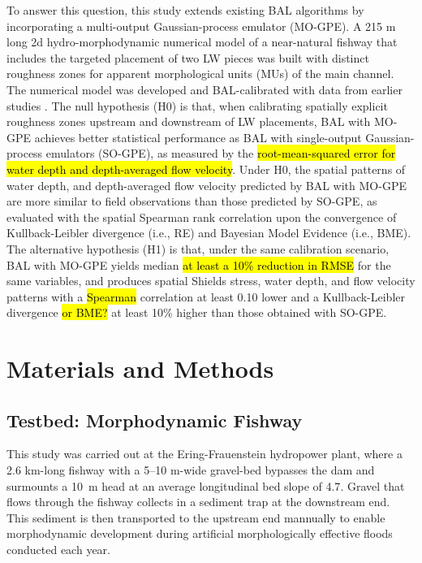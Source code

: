\documentclass[draft,linenumbers,onecolumn]{agujournal2019} %
\begin{document}
To answer this question, this study extends existing BAL algorithms by incorporating a multi-output Gaussian-process emulator (MO-GPE). A 215 m long 2d hydro-morphodynamic numerical model of a near-natural fishway that includes the targeted placement of two LW pieces was built with distinct roughness zones for apparent morphological units (MUs) of the main channel. The numerical model was developed and BAL-calibrated with data from earlier studies \cite{schwindt2023fuzzylogic, schalko2024flow, scolari2025hydromorphodynamic}. The null hypothesis (H0) is that, when calibrating spatially explicit roughness zones upstream and downstream of LW placements, BAL with MO-GPE achieves better statistical performance as BAL with single-output Gaussian-process emulators (SO-GPE), as measured by the \hl{root-mean-squared error for water depth and depth-averaged flow velocity}. Under H0, the spatial patterns of water depth, and depth-averaged flow velocity predicted by BAL with MO-GPE are more similar to field observations than those predicted by SO-GPE, as evaluated with the spatial Spearman rank correlation upon the convergence of Kullback-Leibler divergence (i.e., RE) and  Bayesian Model Evidence (i.e., BME). The alternative hypothesis (H1) is that, under the same calibration scenario, BAL with MO-GPE yields median \hl{at least a 10\% reduction in RMSE} for the same variables, and produces spatial Shields stress, water depth, and flow velocity patterns with a \hl{Spearman} correlation at least 0.10 lower and a Kullback-Leibler divergence \hl{or BME?} at least 10\% higher than those obtained with SO-GPE.


\section{Materials and Methods} 
\label{sec:methods}

\subsection{Testbed: Morphodynamic Fishway}
\label{sec:testbed}

This study was carried out at the Ering-Frauenstein hydropower plant, where a 2.6 km-long fishway with a 5--10 m-wide gravel-bed bypasses the dam and surmounts a 10~m head at an average longitudinal bed slope of 4.7\textperthousand \cite{zauner2020wie}. Gravel that flows through the fishway collects in a sediment trap at the downstream end. This sediment is then transported to the upstream end mannually to enable morphodynamic development during artificial morphologically effective floods conducted each year.
\end{document}
